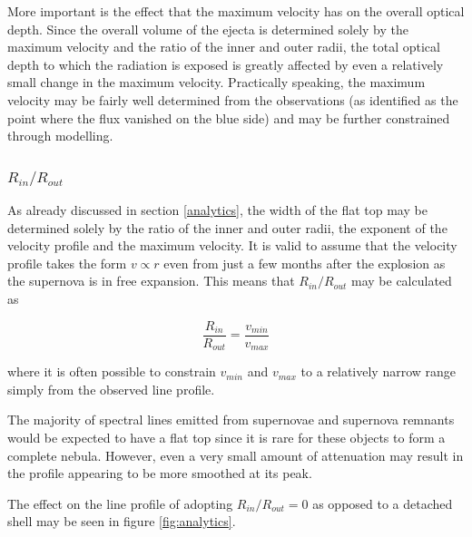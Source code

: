 \documentclass[useAMS,usenatbib,usegraphicx]{mnras}
\begin{document}
More important is the effect that the maximum velocity has on the overall optical depth.  Since the overall volume of the ejecta is determined solely by the maximum velocity and the ratio of the inner and outer radii, the total optical depth to which the radiation is exposed is greatly affected by even a relatively small change in the maximum velocity.  Practically speaking, the maximum velocity may be fairly well determined from the observations (as identified as the point where the flux vanished on the blue side) and may be further constrained through modelling.

\subsubsection{$R_{in}/R_{out}$}
As already discussed in section \ref{analytics}, the width of the flat top may be determined solely by the ratio of the inner and outer radii, the exponent of the velocity profile and the maximum velocity.  It is valid to assume that the velocity profile takes the form $v \propto r$ even from just a few months after the explosion as the supernova is in free expansion.  This means that $R_{in}/R_{out}$ may be calculated as

\[
\frac{R_{in}}{R_{out}}=\frac{v_{min}}{v_{max}}
\]

\noindent where it is often possible to constrain $v_{min}$ and $v_{max}$ to a relatively narrow range simply from the observed line profile.

The majority of spectral lines emitted from supernovae and supernova remnants would be expected to have a flat top since it is rare for these objects to form a complete nebula.  However, even a very small amount of attenuation may result in the profile appearing to be more smoothed at its peak.

The effect on the line profile of adopting  $R_{in}/R_{out}=0$ as opposed to a detached shell may be seen in figure \ref{fig:analytics}.
\end{document}
